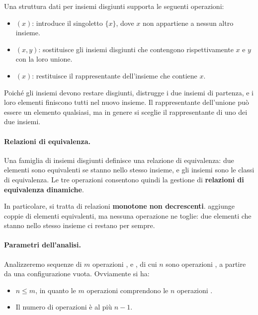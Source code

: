 \begin{definizione}\label{def:uf-operazioni}
Una struttura dati per insiemi disgiunti supporta le seguenti operazioni:
\begin{itemize}
    \item \MakeSet$(x)$: introduce il singoletto $\{x\}$, dove $x$ non appartiene a nessun altro insieme.
    \item \Union$(x,y)$: sostituisce gli insiemi disgiunti che contengono rispettivamente $x$ e $y$ con la loro unione.
    \item \FindSet$(x)$: restituisce il rappresentante dell'insieme che contiene $x$.
\end{itemize}
\end{definizione}

Poiché gli insiemi devono restare disgiunti, \Union{} distrugge i due insiemi di partenza, e i loro elementi finiscono tutti nel nuovo insieme. Il rappresentante dell'unione può essere un elemento qualsiasi, ma in genere si sceglie il rappresentante di uno dei due insiemi.

\paragraph{Relazioni di equivalenza.}
Una famiglia di insiemi disgiunti definisce una relazione di equivalenza: due elementi sono equivalenti se stanno nello stesso insieme, e gli insiemi sono le classi di equivalenza. Le tre operazioni consentono quindi la gestione di \textbf{relazioni di equivalenza dinamiche}.

In particolare, si tratta di relazioni \textbf{monotone non decrescenti}. \Union{} aggiunge coppie di elementi equivalenti, ma nessuna operazione ne toglie: due elementi che stanno nello stesso insieme ci restano per sempre.

\paragraph{Parametri dell'analisi.}
Analizzeremo sequenze di $m$ operazioni \MakeSet{}, \Union{} e \FindSet{}, di cui $n$ sono operazioni \MakeSet{}, a partire da una configurazione vuota. Ovviamente si ha:
\begin{itemize}
    \item $n \le m$, in quanto le $m$ operazioni comprendono le $n$ operazioni \MakeSet{}.
    \item Il numero di operazioni \Union{} è al più $n - 1$.
\end{itemize}

